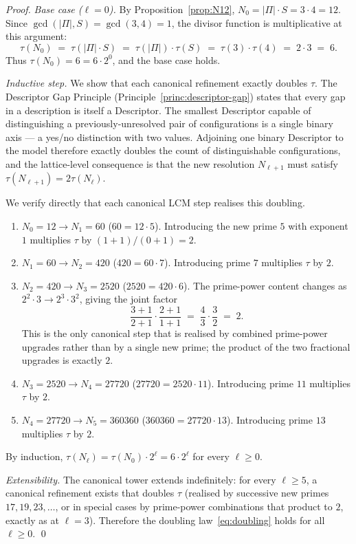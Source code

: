 \documentclass[11pt,a4paper]{article}
\theoremstyle{definition}
\theoremstyle{remark}
\begin{document}
\begin{proof}
\emph{Base case ($\ell=0$).} By Proposition~\ref{prop:N12}, $N_{0} = |\Pi|\cdot S = 3\cdot 4 = 12$. Since $\gcd(|\Pi|, S) = \gcd(3,4) = 1$, the divisor function is multiplicative at this argument:
\[
\tau(N_{0}) \;=\; \tau(|\Pi|\cdot S) \;=\; \tau(|\Pi|)\cdot \tau(S) \;=\; \tau(3)\cdot \tau(4) \;=\; 2\cdot 3 \;=\; 6.
\]
Thus $\tau(N_{0}) = 6 = 6\cdot 2^{0}$, and the base case holds.

\emph{Inductive step.} We show that each canonical refinement exactly doubles $\tau$. The Descriptor Gap Principle (Principle~\ref{princ:descriptor-gap}) states that every gap in a description is itself a Descriptor. The smallest Descriptor capable of distinguishing a previously-unresolved pair of configurations is a single binary axis --- a yes/no distinction with two values. Adjoining one binary Descriptor to the model therefore exactly doubles the count of distinguishable configurations, and the lattice-level consequence is that the new resolution $N_{\ell+1}$ must satisfy $\tau(N_{\ell+1}) = 2\tau(N_{\ell})$.

We verify directly that each canonical LCM step realises this doubling.
\begin{enumerate}[leftmargin=*]
\item \emph{$N_{0}=12 \to N_{1}=60$} ($60 = 12\cdot 5$). Introducing the new prime $5$ with exponent $1$ multiplies $\tau$ by $(1+1)/(0+1) = 2$.
\item \emph{$N_{1}=60 \to N_{2}=420$} ($420 = 60\cdot 7$). Introducing prime $7$ multiplies $\tau$ by $2$.
\item \emph{$N_{2}=420 \to N_{3}=2520$} ($2520 = 420 \cdot 6$). The prime-power content changes as $2^{2}\cdot 3 \to 2^{3}\cdot 3^{2}$, giving the joint factor
\[
\frac{3+1}{2+1}\cdot\frac{2+1}{1+1} \;=\; \frac{4}{3}\cdot\frac{3}{2} \;=\; 2.
\]
This is the only canonical step that is realised by combined prime-power upgrades rather than by a single new prime; the product of the two fractional upgrades is exactly $2$.
\item \emph{$N_{3}=2520 \to N_{4}=27720$} ($27720 = 2520\cdot 11$). Introducing prime $11$ multiplies $\tau$ by $2$.
\item \emph{$N_{4}=27720 \to N_{5}=360360$} ($360360 = 27720\cdot 13$). Introducing prime $13$ multiplies $\tau$ by $2$.
\end{enumerate}
By induction, $\tau(N_{\ell}) = \tau(N_{0})\cdot 2^{\ell} = 6\cdot 2^{\ell}$ for every $\ell\ge 0$.

\emph{Extensibility.} The canonical tower extends indefinitely: for every $\ell\ge 5$, a canonical refinement exists that doubles $\tau$ (realised by successive new primes $17,19,23,\ldots$, or in special cases by prime-power combinations that product to $2$, exactly as at $\ell=3$). Therefore the doubling law~\eqref{eq:doubling} holds for all $\ell\ge 0$. \qed
\end{proof}
\end{document}
